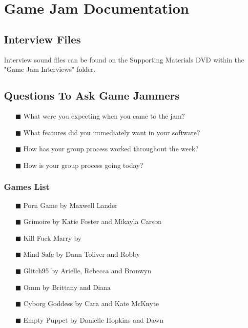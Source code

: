 
\chapter{Game Jam Documentation} %

\label{AppendixC} %



\section{Interview Files}
Interview sound files can be found on the Supporting Materials DVD within the "Game Jam Interviews" folder.

\section{Questions To Ask Game Jammers}


\begin{itemize} 
\item[\tiny{$\blacksquare$}] What were you expecting when you came to the jam?
\item[\tiny{$\blacksquare$}] What features did you immediately want in your software?
\item[\tiny{$\blacksquare$}] How has your group process worked throughout the week?
\item[\tiny{$\blacksquare$}] How is your group process going today?
\end{itemize}

\subsection{Games List}
\begin{itemize} 
\item[\tiny{$\blacksquare$}] Porn Game by Maxwell Lander
\item[\tiny{$\blacksquare$}] Grimoire by Katie Foster and Mikayla Carson
\item[\tiny{$\blacksquare$}] Kill Fuck Marry by 
\item[\tiny{$\blacksquare$}] Mind Safe by Dann Toliver and Robby
\item[\tiny{$\blacksquare$}] Glitch95 by Arielle, Rebecca and Bronwyn
\item[\tiny{$\blacksquare$}] Omm by Brittany and Diana
\item[\tiny{$\blacksquare$}] Cyborg Goddess by Cara and Kate McKnyte
\item[\tiny{$\blacksquare$}] Empty Puppet by Danielle Hopkins and Dawn
\end{itemize}

